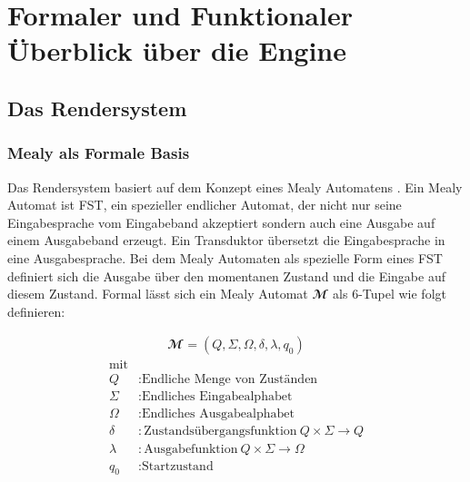 \chapter{Formaler und Funktionaler Überblick über die Engine}

\section{Das Rendersystem}


\subsection{Mealy als Formale Basis}

Das Rendersystem basiert auf dem Konzept eines Mealy Automatens \parencite{Mealy1955}. Ein Mealy Automat ist \ac{FST}, ein spezieller endlicher Automat, der nicht nur seine Eingabesprache vom Eingabeband akzeptiert sondern auch eine Ausgabe auf einem Ausgabeband erzeugt. Ein Transduktor übersetzt die Eingabesprache in eine Ausgabesprache. Bei dem Mealy Automaten als spezielle Form eines \ac{FST} definiert sich die Ausgabe über den momentanen Zustand und die Eingabe auf diesem Zustand. Formal lässt sich ein Mealy Automat $\mathbfcal{M}$ als 6-Tupel wie folgt definieren:

\begin{align}
\mathbfcal{M} = \left( Q, \Sigma, \Omega, \delta, \lambda, q_0 \right)
\label{def:mealy-formal}
\end{align}
\begin{align*}
	\text{mit}\\
	Q &: \text{Endliche Menge von Zuständen} \\
	\Sigma  &:\text{Endliches Eingabealphabet} \\
	\Omega  &:\text{Endliches Ausgabealphabet} \\
	\delta  &:\text{Zustandsübergangsfunktion}\ Q \times \Sigma \rightarrow Q \\
	\lambda &:\text{Ausgabefunktion}\ Q \times \Sigma \rightarrow \Omega \\
	q_0 &: \text{Startzustand}
\end{align*}

